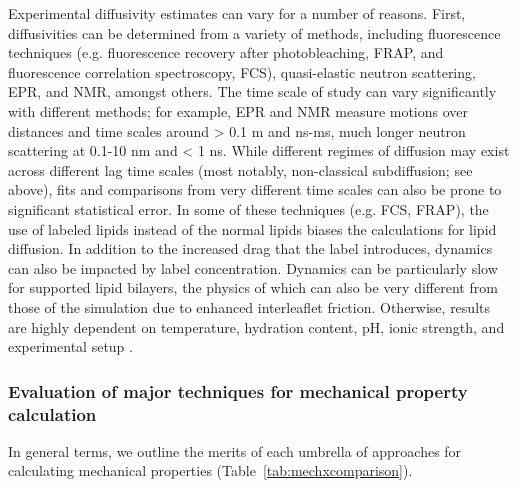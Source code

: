 \documentclass[9pt,bestpractices]{livecoms}
\begin{document}
Experimental diffusivity estimates can vary for a number of reasons.
First, diffusivities can be determined from a variety of methods, including fluorescence techniques (e.g. fluorescence recovery after photobleaching, FRAP, and fluorescence correlation spectroscopy, FCS), quasi-elastic neutron scattering, EPR, and NMR, amongst others.
The time scale of study can vary significantly with different methods; for example, EPR and NMR measure motions over distances and time scales around > 0.1 m and ns-ms, much longer neutron scattering at 0.1-10 nm and < 1 ns.
While different regimes of diffusion may exist across different lag time scales (most notably, non-classical subdiffusion; see above), fits and comparisons from very different time scales can also be prone to significant statistical error.
In some of these techniques (e.g. FCS, FRAP), the use of labeled lipids instead of the normal lipids biases the calculations for lipid diffusion.
In addition to the increased drag that the label introduces, dynamics can also be impacted by label concentration.
Dynamics can be particularly slow for supported lipid bilayers, the physics of which can also be very different from those of the simulation due to enhanced interleaflet friction.
Otherwise, results are highly dependent on temperature, hydration content, pH, ionic strength, and experimental setup \cite{Poger2016}.

\subsubsection{Evaluation of major techniques for mechanical property calculation}
\label{subsubsec:mecheval}
In general terms, we outline the merits of each umbrella of approaches for calculating mechanical properties (Table~\ref{tab:mechxcomparison}).
\end{document}
